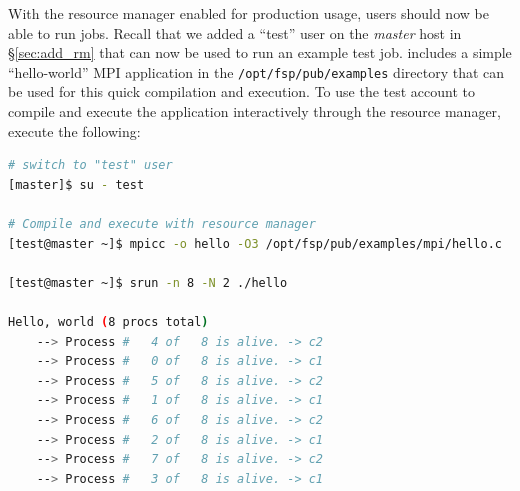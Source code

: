 \documentclass[letterpaper]{article}
\begin{document}
With the resource manager enabled for production usage, users should now be
able to run jobs.  Recall that we added a ``test'' user on the {\em master}
host in \S\ref{sec:add_rm} that can now be used to run an example test job.
\FSP{} includes a simple ``hello-world'' MPI application in the
\texttt{/opt/fsp/pub/examples} directory that can be used for this quick
compilation and execution.  To use the test account to compile and execute the
application interactively through the resource manager, execute the following:

\begin{lstlisting}[language=bash,keywords={}]
# switch to "test" user
[master]$ su - test

# Compile and execute with resource manager
[test@master ~]$ mpicc -o hello -O3 /opt/fsp/pub/examples/mpi/hello.c

[test@master ~]$ srun -n 8 -N 2 ./hello

Hello, world (8 procs total)
    --> Process #   4 of   8 is alive. -> c2
    --> Process #   0 of   8 is alive. -> c1
    --> Process #   5 of   8 is alive. -> c2
    --> Process #   1 of   8 is alive. -> c1
    --> Process #   6 of   8 is alive. -> c2
    --> Process #   2 of   8 is alive. -> c1
    --> Process #   7 of   8 is alive. -> c2
    --> Process #   3 of   8 is alive. -> c1
\end{lstlisting}



\end{document}
